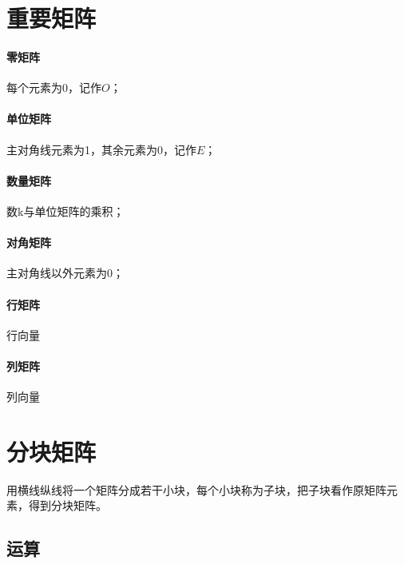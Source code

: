 \section{重要矩阵}

\paragraph{零矩阵}
每个元素为0，记作\(O\)；


\paragraph{单位矩阵}
主对角线元素为1，其余元素为0，记作\(E\)；


\paragraph{数量矩阵}
数k与单位矩阵的乘积；


\paragraph{对角矩阵}
主对角线以外元素为0；


\paragraph{行矩阵}
行向量


\paragraph{列矩阵}
列向量


\section{分块矩阵}

用横线纵线将一个矩阵分成若干小块，每个小块称为子块，把子块看作原矩阵元素，得到分块矩阵。

\subsection{运算}

